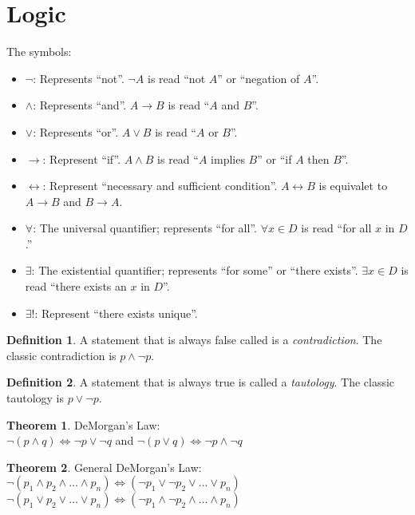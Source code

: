 \documentclass[11pt]{article}
\theoremstyle{definition}
\newtheorem{theorem}{Theorem}[section]
\newtheorem{definition}{Definition}[section]
\begin{document}
\section{Logic}
The symbols:
\begin{itemize}
    \item $\lnot$: Represents ``not''. $\lnot A$ is read ``not $A$'' or ``negation of $A$''.
    \item $\land$: Represents ``and''. $A \rightarrow B$ is read ``$A$ and $B$''.
    \item $\lor$: Represents ``or''. $A \lor B$ is read ``$A$ or $B$''.
    \item $\rightarrow$: Represent ``if''. $A \land B$ is read ``$A$ implies $B$'' or ``if $A$ then $B$''.
    \item $\leftrightarrow$: Represent ``necessary and sufficient condition''. $A \leftrightarrow B$ is equivalet to $A \rightarrow B$ and $B \rightarrow A$.
    \item $\forall$: The universal quantifier; represents ``for all''. $\forall x \in D$ is read ``for all $x$ in $D$.''
    \item $\exists$: The existential quantifier; represents ``for some'' or ``there exists''. $\exists x \in D$ is read ``there exists an $x$ in $D$''.
    \item $\exists!$: Represent ``there exists unique''. 
\end{itemize}
\begin{definition}
    A statement that is always false called is a \emph{contradiction}. The classic contradiction is $p \land \lnot p$.
\end{definition}
\begin{definition}
    A statement that is always true is called a \emph{tautology}. The classic tautology is $p \lor \lnot p$.
\end{definition}
\begin{theorem} DeMorgan's Law: \\
    $\lnot (p \land q) \iff \lnot p \lor \lnot q$ and
    $\lnot (p \lor q) \iff \lnot p \land \lnot q$
\end{theorem}
\begin{theorem} General DeMorgan's Law: \\
    $\lnot(p_1 \land p_2 \land \dots \land p_n) \iff (\lnot p_1 \lor \lnot p_2 \lor \dots \lor p_n)$ \\
    $\lnot(p_1 \lor p_2 \lor  \dots \lor  p_n) \iff (\lnot p_1 \land \lnot p_2 \land \dots \land p_n)$ \\
\end{theorem}
\end{document}
